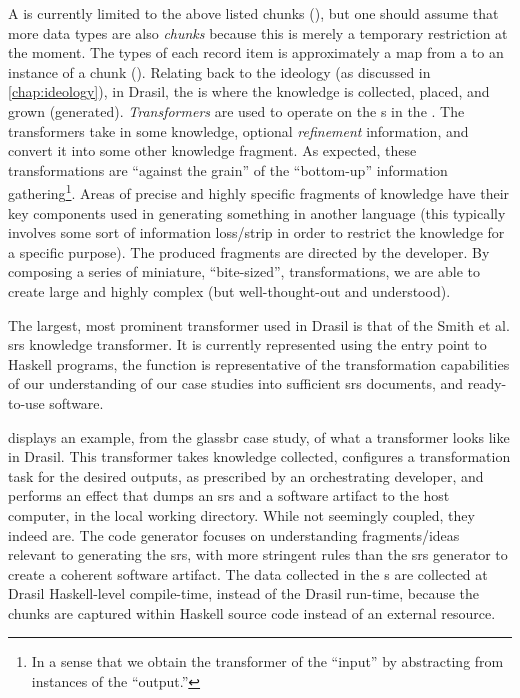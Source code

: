 A \ChunkDB{} is currently limited to the above listed chunks
(), but one should assume that more data types are
also \textit{chunks} because this is merely a temporary restriction at the
moment. The types of each record item is approximately a map from a \UID{} to an
instance of a chunk (). Relating back to the
ideology (as discussed in \autoref{chap:ideology}), in Drasil, the \ChunkDB{} is
where the knowledge is collected, placed, and grown (generated).
\textit{Transformers} are used to operate on the \Chunk{}s in the \ChunkDB{}.
The transformers take in some knowledge, optional \textit{refinement}
information, and convert it into some other knowledge fragment. As expected,
these transformations are ``against the grain'' of the ``bottom-up'' information
gathering\footnote{In a sense that we obtain the transformer of the ``input'' by
abstracting from instances of the ``output.''}. Areas of precise and highly
specific fragments of knowledge have their key components used in generating
something in another language (this typically involves some sort of information
loss/strip in order to restrict the knowledge for a specific purpose). The
produced fragments are directed by the developer. By composing a series of
miniature, ``bite-sized'', transformations, we are able to create large and
highly complex (but well-thought-out and understood).

The largest, most prominent transformer used in Drasil is that of the Smith et
al. \acs{srs} knowledge transformer. It is currently represented using the entry
point to Haskell programs, the  function is
representative of the transformation capabilities of our understanding of our
case studies into sufficient \acs{srs} documents, and ready-to-use software.

\currentGlassBRMainFHaskell{}

 displays an example, from the \acs{glassbr} case
study, of what a transformer looks like in Drasil. This transformer takes
knowledge collected, configures a transformation task for the desired outputs,
as prescribed by an orchestrating developer, and performs an 
effect that dumps an \acs{srs} and a software artifact to the host computer, in
the local working directory. While not seemingly coupled, they indeed are. The
code generator focuses on understanding fragments/ideas relevant to generating
the \acs{srs}, with more stringent rules than the \acs{srs} generator to create
a coherent software artifact. The data collected in the \ChunkDB{}s are
collected at Drasil Haskell-level compile-time, instead of the Drasil run-time,
because the chunks are captured within Haskell source code instead of an
external resource.

